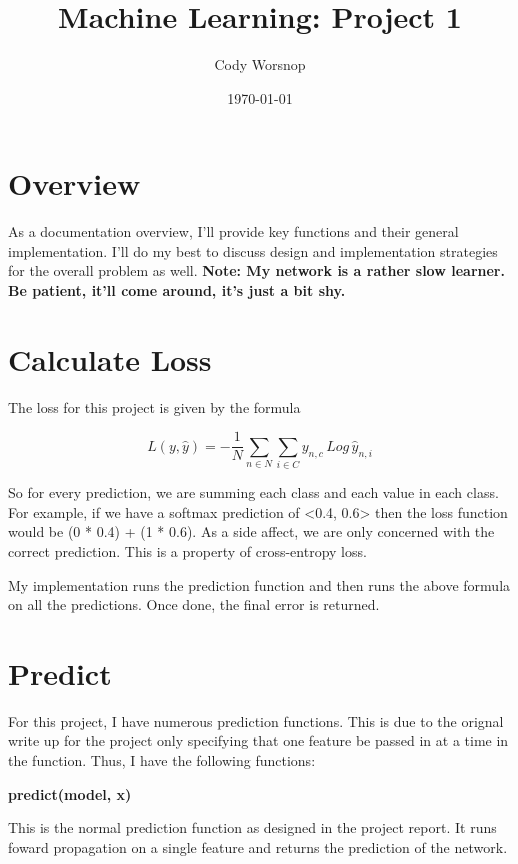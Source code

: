 \documentclass{article}
\title{Machine Learning: Project 1}
\author{Cody Worsnop}
\date{\today}
\begin{document}
\maketitle 

\section*{Overview} %

As a documentation overview, I'll provide key functions and their general implementation. I'll do my best to discuss design and implementation strategies for the overall problem as well. 
\newline
\newline
\bf Note: \rm
My network is a rather slow learner. Be patient, it'll come around, it's just a bit shy. 

\section*{Calculate Loss} %

The loss for this project is given by the formula 

\begin{equation}
L(y, \hat{y}) = -\frac{1}{N}\sum_{n\in{N}}\sum_{i\in{C}}y_{n,c}\,Log\,\hat{y}_{n,i}
\end{equation}

So for every prediction, we are summing each class and each value in each class. For example, if we have a softmax prediction of <0.4, 0.6> then the loss function would be (0 * 0.4) + (1 * 0.6). As a side affect, we are only concerned with the correct prediction. This is a property of cross-entropy loss. 

My implementation runs the prediction function and then runs the above formula on all the predictions. Once done, the final error is returned. 

\section*{Predict} 

For this project, I have numerous prediction functions. This is due to the orignal write up for the project only specifying that one feature be passed in at a time in the function. Thus, I have the following functions: 

\textbf{predict(model, x)}

This is the normal prediction function as designed in the project report. It runs foward propagation on a single feature and returns the prediction of the network. 
\end{document}

